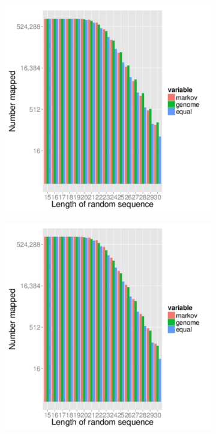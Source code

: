 \documentclass{article}
\begin{document}
\begin{figure}[t]
   \centering
   \begin{subfigure}{.5\textwidth}
      \centering
      \includegraphics[width=.9\textwidth,natwidth=100,natheight=100]{hg38_mapped_1000000.pdf}
      \caption{}
      \label{fig:hg38_mapped}
   \end{subfigure}%
   \begin{subfigure}{.5\textwidth}
      \centering
      \includegraphics[width=.9\textwidth,natwidth=100,natheight=100]{mm10_mapped_1000000.pdf}

\end{subfigure}
\end{figure}
\end{document}
